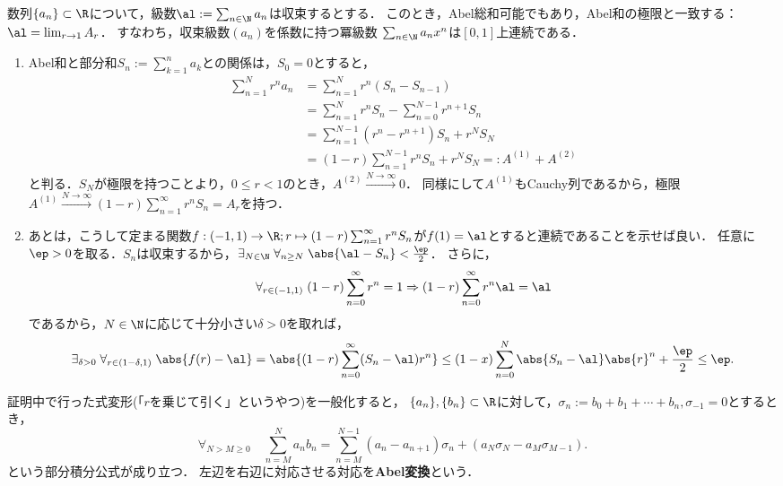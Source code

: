 \documentclass[uplatex,dvipdfmx]{jsreport}
\begin{document}
\begin{theorem}[Abelの連続性定理]
    数列$\{a_n\}\subset\R$について，級数$\al:=\sum_{n\in\N}a_n$は収束するとする．
    このとき，Abel総和可能でもあり，Abel和の極限と一致する：$\al=\lim_{r\to1}A_r$．
    すなわち，収束級数$(a_n)$を係数に持つ冪級数
    $\sum_{n\in\N}a_nx^n$は$[0,1]$上連続である．
\end{theorem}
\begin{Proof}\mbox{}
    \begin{enumerate}
        \item Abel和と部分和$S_n:=\sum_{k=1}^na_k$との関係は，$S_0=0$とすると，
        \begin{align*}
            \sum_{n=1}^Nr^na_n&=\sum_{n=1}^Nr^n(S_n-S_{n-1})\\
            &=\sum_{n=1}^Nr^nS_n-\sum_{n=0}^{N-1}r^{n+1}S_n\\
            &=\sum_{n=1}^{N-1}(r^n-r^{n+1})S_n+r^NS_N\\
            &=(1-r)\sum_{n=1}^{N-1}r^nS_n+r^NS_N=:A^{(1)}+A^{(2)}
        \end{align*}
        と判る．$S_N$が極限を持つことより，$0\le r<1$のとき，$A^{(2)}\xrightarrow{N\to\infty}0$．
        同様にして$A^{(1)}$もCauchy列であるから，極限$A^{(1)}\xrightarrow{N\to\infty}(1-r)\sum_{n=1}^\infty r^nS_n=A_r$を持つ．
        \item あとは，こうして定まる関数$f:(-1,1)\to\R;r\mapsto(1-r)\sum_{n=1}^\infty r^nS_n$が$f(1)=\al$とすると連続であることを示せば良い．
        任意に$\ep>0$を取る．$S_n$は収束するから，$\exists_{N\in\N}\;\forall_{n\ge N}\;\abs{\al-S_n}<\frac{\ep}{2}$．
        さらに，
        \[\forall_{r\in(-1,1)}\;(1-r)\sum_{n=0}^\infty r^n=1\Rightarrow(1-r)\sum_{n=0}^\infty r^n\al=\al\]
        であるから，$N\in\N$に応じて十分小さい$\delta>0$を取れば，
        \[\exists_{\delta>0}\;\forall_{r\in(1-\delta,1)}\;\abs{f(r)-\al}=\abs{(1-r)\sum_{n=0}^\infty(S_n-\al)r^n}\le(1-x)\sum_{n=0}^N\abs{S_n-\al}\abs{r}^n+\frac{\ep}{2}\le\ep.\]
    \end{enumerate}
\end{Proof}
\begin{remarks}[Abelの部分和公式]
    証明中で行った式変形(「$r$を乗じて引く」というやつ)を一般化すると，
    $\{a_n\},\{b_n\}\subset\R$に対して，$\sigma_n:=b_0+b_1+\cdots+b_n,\sigma_{-1}=0$とするとき，
    \[\forall_{N>M\ge 0}\quad\sum_{n=M}^Na_nb_n=\sum_{n=M}^{N-1}(a_n-a_{n+1})\sigma_n+(a_N\sigma_N-a_M\sigma_{M-1}).\]
    という部分積分公式が成り立つ．
    左辺を右辺に対応させる対応を\textbf{Abel変換}という．
\end{remarks}
\end{document}
